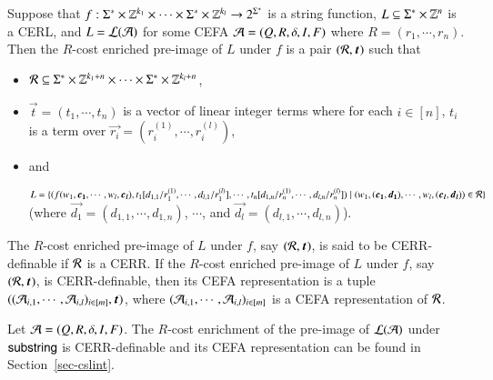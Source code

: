 \documentclass{llncs}
\begin{document}
\begin{definition}
Suppose that $f: \Sigma^* \times \mathbb{Z}^{k_1} \times \cdots \times \Sigma^* \times \mathbb{Z}^{k_l} \rightarrow 2^{\Sigma^*}$ is a string function, $L \subseteq \Sigma^* \times \mathbb{Z}^n$ is a CERL, and $L = \mathcal{L}(\mathcal{A})$ for some CEFA $\mathcal{A}=(Q, R, \delta, I, F)$ where $R= (r_1, \cdots, r_n)$. Then the $R$-cost enriched pre-image of $L$ under $f$ is a pair $(\cR, \vec{t})$ such that 
\begin{itemize}
\item $\mathcal{R} \subseteq \Sigma^* \times \mathbb{Z}^{k_1 + n} \times \cdots \times \Sigma^* \times \mathbb{Z}^{k_l + n}$,
\item $\vec{t} = (t_1, \cdots ,t_n)$ is a vector of linear integer terms where for each $i \in [n]$, $t_i$ is a term over $\vec{r_i} = (r^{(1)}_i, \cdots, r^{(l)}_i)$,
\item and 

$L = \{(f(w_1, \vec{c_1}, \cdots, w_l, \vec{c_l}), t_1[d_{1,1}/r^{(1)}_1, \cdots, d_{l, 1}/r^{(l)}_1], \cdots, t_n[d_{1,n}/r^{(1)}_n, \cdots, d_{l, n}/r^{(l)}_n]) \mid (w_1, (\vec{c_1}, \vec{d_1}), \cdots, w_l, (\vec{c_l}, \vec{d_l})) \in \cR\}$ 
%
(where $\vec{d_1}=(d_{1,1}, \cdots, d_{1,n})$, $\cdots$, and $\vec{d_l}=(d_{l,1},\cdots, d_{l,n})$).
\end{itemize}
The $R$-cost enriched pre-image of $L$ under $f$, say $(\cR, \vec{t})$, is said to be CERR-definable if $\mathcal{R}$ is a CERR. If the $R$-cost enriched pre-image of $L$ under $f$, say $(\cR, \vec{t})$, is CERR-definable,  then its CEFA representation is a tuple $((\Aut_{i,1}, \cdots, \Aut_{i, l})_{i \in [m]}, \vec{t})$, where $(\mathcal{A}_{i,1}, \cdots, \mathcal{A}_{i, l})_{i \in [m]}$ is a CEFA representation of $\mathcal{R}$. 
\end{definition}


\begin{example}
Let $\mathcal{A} = (Q, R, \delta, I, F)$. The $R$-cost enrichment of the pre-image of $\mathcal{L}(\mathcal{A})$ under $\mathsf{substring}$ is CERR-definable and its CEFA representation can be found in Section~\ref{sec-cslint}.
\end{example}


\end{document}
